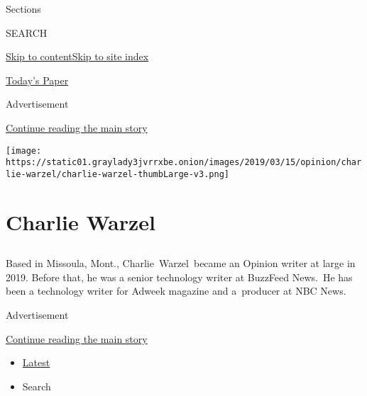 Sections

SEARCH

\protect\hyperlink{site-content}{Skip to
content}\protect\hyperlink{site-index}{Skip to site index}

\href{https://myaccount.nytimes3xbfgragh.onion/auth/login?response_type=cookie\&client_id=vi}{}

\href{https://www.nytimes3xbfgragh.onion/section/todayspaper}{Today's
Paper}

Advertisement

\protect\hyperlink{after-top}{Continue reading the main story}

\texttt{[image: https://static01.graylady3jvrrxbe.onion/images/2019/03/15/opinion/charlie-warzel/charlie-warzel-thumbLarge-v3.png]}

\hypertarget{charlie-warzel}{%
\section{Charlie Warzel}\label{charlie-warzel}}

\subsection{}

Based in Missoula, Mont., Charlie~Warzel~became an Opinion writer at
large in 2019. Before that, he was a senior technology writer at
BuzzFeed News.~He has been a technology writer for Adweek magazine and
a~producer at NBC News.

Advertisement

\protect\hyperlink{after-mid1}{Continue reading the main story}

\begin{itemize}
\tightlist
\item
  \protect\hyperlink{stream-panel}{Latest}
\item
  Search
\end{itemize}

